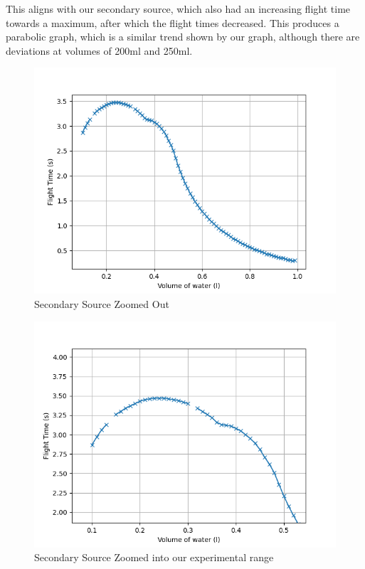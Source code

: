 \documentclass[14pt]{article}
\begin{document}
This aligns with our secondary source, which also had an increasing flight time towards a maximum, after which the flight times decreased. This produces a parabolic graph, which is a similar trend shown by our graph, although there are deviations at volumes of 200ml and 250ml.
\begin{figure}[h]
    \centering
    \includegraphics[width=\textwidth]{second-source.png}
    \caption{Secondary Source Zoomed Out}
\end{figure}
\FloatBarrier
\begin{figure}[h]
    \centering
    \includegraphics[width=\textwidth]{second-source-zoomed-in.png}
    \caption{Secondary Source Zoomed into our experimental range}
\end{figure}
\end{document}
